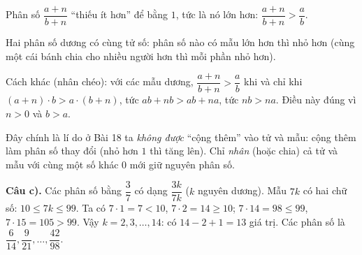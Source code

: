 {
Phân số $\dfrac{a+n}{b+n}$ ``thiếu ít hơn'' để bằng $1$, tức là nó lớn hơn: $\dfrac{a+n}{b+n}>\dfrac ab$.

\begin{recallbox}Hai phân số dương có cùng tử số: phân số nào có mẫu lớn hơn thì nhỏ hơn (cùng một cái bánh chia cho nhiều người hơn thì mỗi phần nhỏ hơn).\end{recallbox}

\begin{proofbox}Cách khác (nhân chéo): với các mẫu dương, $\dfrac{a+n}{b+n}>\dfrac ab$ khi và chỉ khi $(a+n)\cdot b>a\cdot(b+n)$, tức $ab+nb>ab+na$, tức $nb>na$. Điều này đúng vì $n>0$ và $b>a$.\end{proofbox}

\begin{warnbox}Đây chính là lí do ở Bài 18 ta \emph{không được} ``cộng thêm'' vào tử và mẫu: cộng thêm làm phân số thay đổi (nhỏ hơn $1$ thì tăng lên). Chỉ \emph{nhân} (hoặc chia) cả tử và mẫu với cùng một số khác $0$ mới giữ nguyên phân số.\end{warnbox}

\par\smallskip\textbf{Câu c).}
Các phân số bằng $\dfrac37$ có dạng $\dfrac{3k}{7k}$ ($k$ nguyên dương). Mẫu $7k$ có hai chữ số: $10\le 7k\le 99$. Ta có $7\cdot 1=7<10$, $7\cdot 2=14\ge 10$; $7\cdot 14=98\le 99$, $7\cdot 15=105>99$. Vậy $k=2,3,\dots,14$: có $14-2+1=13$ giá trị.
Các phân số là $\dfrac{6}{14},\dfrac{9}{21},\dots,\dfrac{42}{98}$.

}

